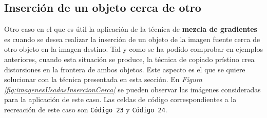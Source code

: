 \documentclass[11pt,twoside,titlepage,a4paper]{article}
\numberwithin{equation}{section} %
\theoremstyle{usual}
\begin{document}
\subsection{Inserción de un objeto cerca de otro}

Otro caso en el que es útil la aplicación de la técnica de \textbf{mezcla de gradientes} es cuando se desea realizar la inserción de un objeto de la imagen fuente cerca de otro objeto en la imagen destino. Tal y como se ha podido comprobar en ejemplos anteriores, cuando esta situación se produce, la técnica de copiado prístino crea distorsiones en la frontera de ambos objetos. Este aspecto es el que se quiere solucionar con la técnica presentada en esta sección. En \textit{Figura \ref{fig:imagenesUsadasInsercionCerca}} se pueden observar las imágenes consideradas para la aplicación de este caso. Las celdas de código correspondientes a la recreación de este caso son \texttt{Código 23} y \texttt{Código 24}.
\end{document}

